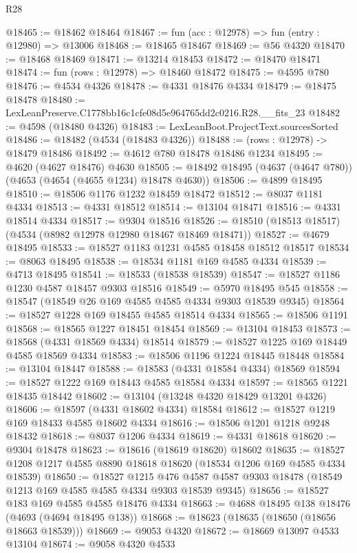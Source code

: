 \begin{lexlean}{R28}
\begin{coremodule}
@18465 := @18462 @18464
@18467 := fun (acc : @12978) => fun (entry : @12980) => @13006
@18468 := @18465 @18467
@18469 := @56 @4320
@18470 := @18468 @18469
@18471 := @13214 @18453
@18472 := @18470 @18471
@18474 := fun (rows : @12978) => @18460 @18472
@18475 := @4595 @780
@18476 := @4534 @4326
@18478 := @4331 @18476 @4334
@18479 := @18475 @18478
@18480 := LexLeanPreserve.C1778bb16c1cfe08d5e964765dd2c0216.R28.__fits_23
@18482 := @4598 (@18480 @4326)
@18483 := LexLeanBoot.ProjectText.sourcesSorted
@18486 := @18482 (@4534 (@18483 @4326))
@18488 := (rows : @12978) -> @18479 @18486
@18492 := @4612 @780 @18478 @18486 @1234
@18495 := @4620 (@4627 @18476) @4630
@18505 := @18492 @18495 (@4637 (@4647 @780)) (@4653 (@4654 (@4655 @1234) @18478 @4630))
@18506 := @4899 @18495
@18510 := @18506 @1176 @1232 @18459 @18472
@18512 := @8037 @1181 @4334
@18513 := @4331 @18512
@18514 := @13104 @18471
@18516 := @4331 @18514 @4334
@18517 := @9304 @18516
@18526 := @18510 (@18513 @18517) (@4534 (@8982 @12978 @12980 @18467 @18469 @18471))
@18527 := @4679 @18495
@18533 := @18527 @1183 @1231 @4585 @18458 @18512 @18517
@18534 := @8063 @18495
@18538 := @18534 @1181 @169 @4585 @4334
@18539 := @4713 @18495
@18541 := @18533 (@18538 @18539)
@18547 := @18527 @1186 @1230 @4587 @18457 @9303 @18516
@18549 := @5970 @18495 @545
@18558 := @18547 (@18549 @26 @169 @4585 @4585 @4334 @9303 @18539 @9345)
@18564 := @18527 @1228 @169 @18455 @4585 @18514 @4334
@18565 := @18506 @1191
@18568 := @18565 @1227 @18451 @18454
@18569 := @13104 @18453
@18573 := @18568 (@4331 @18569 @4334) @18514
@18579 := @18527 @1225 @169 @18449 @4585 @18569 @4334
@18583 := @18506 @1196 @1224 @18445 @18448
@18584 := @13104 @18447
@18588 := @18583 (@4331 @18584 @4334) @18569
@18594 := @18527 @1222 @169 @18443 @4585 @18584 @4334
@18597 := @18565 @1221 @18435 @18442
@18602 := @13104 (@13248 @4320 @18429 @13201 @4326)
@18606 := @18597 (@4331 @18602 @4334) @18584
@18612 := @18527 @1219 @169 @18433 @4585 @18602 @4334
@18616 := @18506 @1201 @1218 @9248 @18432
@18618 := @8037 @1206 @4334
@18619 := @4331 @18618
@18620 := @9304 @18478
@18623 := @18616 (@18619 @18620) @18602
@18635 := @18527 @1208 @1217 @4585 @8890 @18618 @18620 (@18534 @1206 @169 @4585 @4334 @18539)
@18650 := @18527
    @1215
    @476
    @4587
    @4587
    @9303
    @18478
    (@18549 @1213 @169 @4585 @4585 @4334 @9303 @18539 @9345)
@18656 := @18527 @183 @169 @4585 @4585 @18476 @4334
@18663 := @4688 @18495 @138 @18476 (@4693 (@4694 @18495 @138))
@18668 := @18623 (@18635 (@18650 (@18656 @18663 @18539)))
@18669 := @9053 @4320
@18672 := @18669 @13097 @4533 @13104
@18674 := @9058 @4320 @4533

\end{coremodule}
\end{lexlean}

